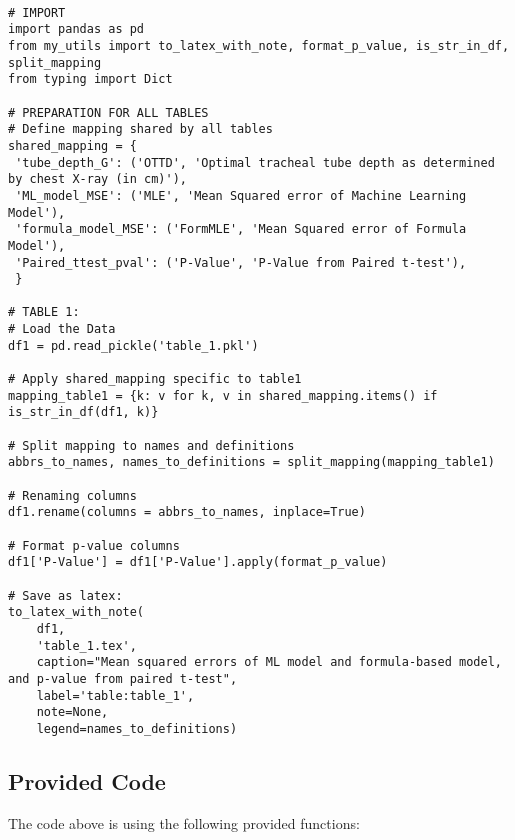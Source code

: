 \documentclass[11pt]{article}
\begin{document}
\begin{verbatim}

# IMPORT
import pandas as pd
from my_utils import to_latex_with_note, format_p_value, is_str_in_df, split_mapping
from typing import Dict

# PREPARATION FOR ALL TABLES
# Define mapping shared by all tables
shared_mapping = {
 'tube_depth_G': ('OTTD', 'Optimal tracheal tube depth as determined by chest X-ray (in cm)'),
 'ML_model_MSE': ('MLE', 'Mean Squared error of Machine Learning Model'),
 'formula_model_MSE': ('FormMLE', 'Mean Squared error of Formula Model'),
 'Paired_ttest_pval': ('P-Value', 'P-Value from Paired t-test'),
 }

# TABLE 1:
# Load the Data
df1 = pd.read_pickle('table_1.pkl')

# Apply shared_mapping specific to table1
mapping_table1 = {k: v for k, v in shared_mapping.items() if is_str_in_df(df1, k)} 

# Split mapping to names and definitions
abbrs_to_names, names_to_definitions = split_mapping(mapping_table1)

# Renaming columns
df1.rename(columns = abbrs_to_names, inplace=True)

# Format p-value columns
df1['P-Value'] = df1['P-Value'].apply(format_p_value)

# Save as latex:
to_latex_with_note(
    df1,
    'table_1.tex',
    caption="Mean squared errors of ML model and formula-based model, and p-value from paired t-test",
    label='table:table_1',
    note=None,
    legend=names_to_definitions)

\end{verbatim}

\subsection{Provided Code}
The code above is using the following provided functions:
\end{document}
